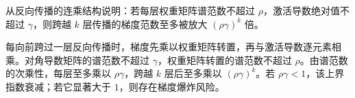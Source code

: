 \begin{exercise}[level=advanced]
从反向传播的连乘结构说明：若每层权重矩阵谱范数不超过 $\rho$，激活导数绝对值不超过 $\gamma$，则跨越 $k$ 层传播的梯度范数至多被放大 $(\rho\gamma)^k$ 倍。
\begin{solution}
每向前跨过一层反向传播时，梯度先乘以权重矩阵转置，再与激活导数逐元素相乘。对角导数矩阵的谱范数不超过 $\gamma$，权重矩阵转置的谱范数不超过 $\rho$。由谱范数的次乘性，每层至多乘以 $\rho\gamma$，跨越 $k$ 层后至多乘以
$(\rho\gamma)^k$。若 $\rho\gamma<1$，该上界指数衰减；若它显著大于 $1$，则存在梯度爆炸风险。
\end{solution}
\end{exercise}

